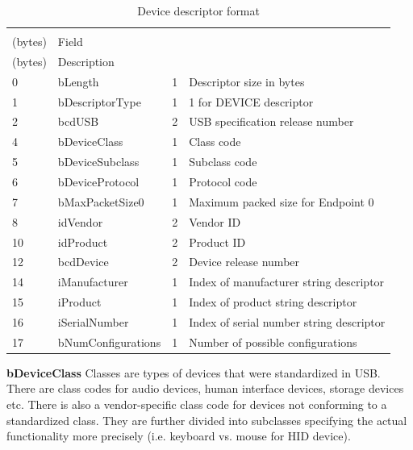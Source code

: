 \documentclass{article}
\begin{document}
\begin{table}[H]
  \caption{Device descriptor format \cite[p. 262f.]{usbstd}}
  \centering
  \begin{tabularx}{\textwidth}{l | l | l | X}
    \begin{tabular}{@{}l} Offset \\ (bytes) \end{tabular} & Field &
    \begin{tabular}{@{}l} Size \\ (bytes) \end{tabular} & Description \\ \hline
    
    0 & bLength & 1 & Descriptor size in bytes \\
    1 & bDescriptorType & 1 & 1 for DEVICE descriptor \\
    2 & bcdUSB & 2 & USB specification release number \\
    4 & bDeviceClass & 1 & Class code \\
    5 & bDeviceSubclass & 1 & Subclass code \\
    6 & bDeviceProtocol & 1 & Protocol code \\
    7 & bMaxPacketSize0 & 1 & Maximum packed size for Endpoint 0  \\
    8 & idVendor & 2 & Vendor ID \\
    10 & idProduct & 2 & Product ID \\
    12 & bcdDevice & 2 & Device release number \\
    14 & iManufacturer & 1 & Index of manufacturer string descriptor \\
    15 & iProduct & 1 & Index of product string descriptor \\
    16 & iSerialNumber & 1 & Index of serial number string descriptor \\
    17 & bNumConfigurations & 1 & Number of possible configurations \\
  \end{tabularx}
\end{table}


{\bf bDeviceClass} Classes are types of devices that were standardized in USB.
There are class codes for audio devices, human interface devices, storage devices etc.
There is also a vendor-specific class code for devices not conforming to a standardized class.
They are further divided into subclasses specifying the actual functionality more
precisely (i.e. keyboard vs. mouse for HID device).
\end{document}

